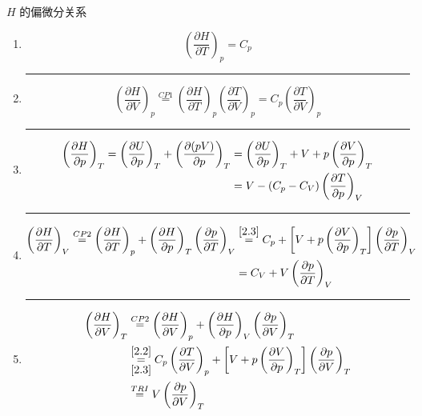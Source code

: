 \begin{example}
    \( H \) 的偏微分关系
    \begin{enumerate}
        \item \[\left(\frac{\partial H}{\partial T}\right)_p = C_p \]
        \hrule
        \item\label{2.2} \[\left(\frac{\partial H}{\partial V}\right)_p 
        \overset{CP1}{=} \left(\frac{\partial H}{\partial T}\right)_p \left(\frac{\partial T}{\partial V}\right)_p 
        = C_p \left(\frac{\partial T}{\partial V}\right)_p 
        \]
        \hrule
        \item\label{2.3} \begin{align*}
        \left(\frac{\partial H}{\partial p}\right)_T 
        = \left(\frac{\partial U}{\partial p}\right)_T 
        + \left(\frac{\partial (pV)}{\partial p}\right)_T 
        &= \left(\frac{\partial U}{\partial p}\right)_T 
        + V + p\left(\frac{\partial V}{\partial p}\right)_T \\
        &=V-(C_p-C_V)\left(\frac{\partial T}{\partial p}\right)_V
        \end{align*}
        \hrule
        \item\label{2.4} \begin{align*}
            \left(\frac{\partial H}{\partial T}\right)_V 
            \overset{CP2}{=} \left(\frac{\partial H}{\partial T}\right)_p 
            + \left(\frac{\partial H}{\partial p}\right)_T \left(\frac{\partial p}{\partial T}\right)_V 
            &\overset{\ref*{2.3}}{=} C_p + \left[ V 
            + p\left(\frac{\partial V}{\partial p}\right)_T \right]
            \left(\frac{\partial p}{\partial T}\right)_V \\
            &=C_V + V\left(\frac{\pa p}{\pa T}\right)_V
        \end{align*}
        \hrule
        \item\label{2.5} \begin{align*}
            \left(\frac{\partial H}{\partial V}\right)_T 
            &\overset{CP2}{=} \left(\frac{\partial H}{\partial V}\right)_p 
            + \left(\frac{\partial H}{\partial p}\right)_V \left(\frac{\partial p}{\partial V}\right)_T \\
            &\overunderset{\ref*{2.2}}{\ref*{2.3}}{=} 
            C_p \left(\frac{\partial T}{\partial V}\right)_p 
            + \left[ V + p\left(\frac{\partial V}{\partial p}\right)_T \right] 
            \left(\frac{\partial p}{\partial V}\right)_T \\
            &\overset{TRI}{=}V\left(\frac{\partial p}{\partial V}\right)_T

\end{align*}
\end{enumerate}
\end{example}
